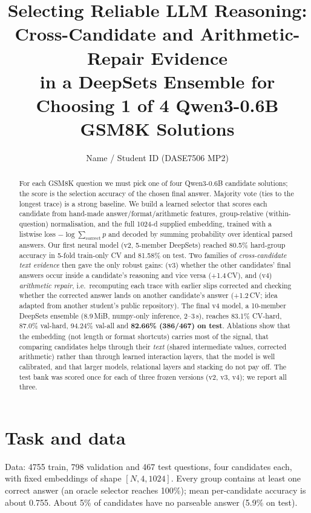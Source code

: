 \documentclass[10pt,a4paper]{article}
\title{\vspace{-1.2cm}\textbf{Selecting Reliable LLM Reasoning: Cross-Candidate and Arithmetic-Repair Evidence\\in a DeepSets Ensemble for Choosing 1 of 4 Qwen3-0.6B GSM8K Solutions}\vspace{-0.3cm}}
\author{Name / Student ID \quad (DASE7506 MP2)}
\date{}
\newcommand{\pt}{\,\text{pt}}
\begin{document}
\maketitle\vspace{-0.8cm}
\begin{abstract}\small
For each GSM8K question we must pick one of four Qwen3-0.6B candidate solutions; the score is the selection accuracy of the chosen final answer. Majority vote (ties to the longest trace) is a strong baseline. We build a learned selector that scores each candidate from hand-made answer/format/arithmetic features, group-relative (within-question) normalisation, and the full 1024-d supplied embedding, trained with a listwise loss $-\log\sum_{\text{correct}}p$ and decoded by summing probability over identical parsed answers. Our first neural model (v2, 5-member DeepSets) reached 80.5\% hard-group accuracy in 5-fold train-only CV and 81.58\% on test. Two families of \emph{cross-candidate text evidence} then gave the only robust gains: (v3) whether the other candidates' final answers occur inside a candidate's reasoning and vice versa (+1.4\pt CV), and (v4) \emph{arithmetic repair}, i.e.\ recomputing each trace with earlier slips corrected and checking whether the corrected answer lands on another candidate's answer (+1.2\pt CV; idea adapted from another student's public repository). The final v4 model, a 10-member DeepSets ensemble (8.9\,MiB, numpy-only inference, 2--3\,s), reaches 83.1\% CV-hard, 87.0\% val-hard, 94.24\% val-all and \textbf{82.66\% (386/467) on test}. Ablations show that the embedding (not length or format shortcuts) carries most of the signal, that comparing candidates helps through their \emph{text} (shared intermediate values, corrected arithmetic) rather than through learned interaction layers, that the model is well calibrated, and that larger models, relational layers and stacking do not pay off. The test bank was scored once for each of three frozen versions (v2, v3, v4); we report all three.
\end{abstract}

\section{Task and data}
Data: 4755 train, 798 validation and 467 test questions, four candidates each, with fixed embeddings of shape $[N,4,1024]$. Every group contains at least one correct answer (an oracle selector reaches 100\%); mean per-candidate accuracy is about 0.755. About 5\% of candidates have no parseable answer (5.9\% on test).
\end{document}
